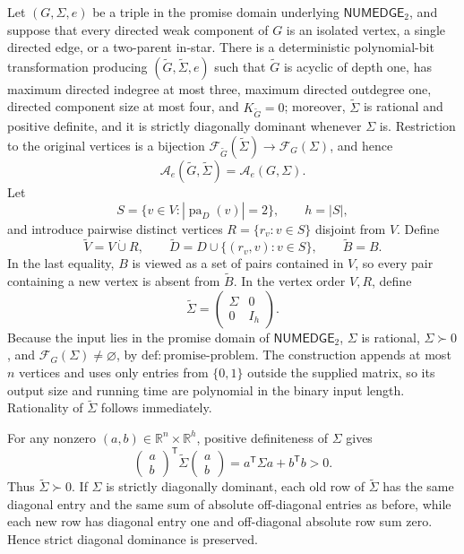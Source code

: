 Let \((G,\Sigma,e)\) be a triple in the promise domain underlying \(\mathsf{NUMEDGE}_2\), and suppose that every directed weak component of \(G\) is an isolated vertex, a single directed edge, or a two-parent in-star. There is a deterministic polynomial-bit transformation producing \((\widetilde G,\widetilde\Sigma,e)\) such that \(\widetilde G\) is acyclic of depth one, has maximum directed indegree at most three, maximum directed outdegree one, directed component size at most four, and \(K_{\widetilde G}=0\); moreover, \(\widetilde\Sigma\) is rational and positive definite, and it is strictly diagonally dominant whenever \(\Sigma\) is. Restriction to the original vertices is a bijection \(\mathcal F_{\widetilde G}(\widetilde\Sigma)\to\mathcal F_G(\Sigma)\), and hence
\[
\mathcal A_e(\widetilde G,\widetilde\Sigma)=\mathcal A_e(G,\Sigma).
\]
Let
\[
S=\{v\in V:|\operatorname{pa}_D(v)|=2\},
\qquad h=|S|,
\]
and introduce pairwise distinct vertices \(R=\{r_v:v\in S\}\) disjoint from \(V\). Define
\[
\widetilde V=V\mathbin{\dot\cup}R,
\qquad
\widetilde D=D\cup\{(r_v,v):v\in S\},
\qquad
\widetilde B=B.
\]
In the last equality, \(B\) is viewed as a set of pairs contained in \(V\), so every pair containing a new vertex is absent from \(\widetilde B\). In the vertex order \(V,R\), define
\[
\widetilde\Sigma=
\begin{pmatrix}
\Sigma&0\\
0&I_h
\end{pmatrix}.
\]
Because the input lies in the promise domain of \(\mathsf{NUMEDGE}_2\), \(\Sigma\) is rational, \(\Sigma\succ0\), and \(\mathcal F_G(\Sigma)\ne\varnothing\), by \(\mathrm{def:promise\mbox{-}problem}\). The construction appends at most \(n\) vertices and uses only entries from \(\{0,1\}\) outside the supplied matrix, so its output size and running time are polynomial in the binary input length. Rationality of \(\widetilde\Sigma\) follows immediately.

For any nonzero \((a,b)\in\mathbb R^n\times\mathbb R^h\), positive definiteness of \(\Sigma\) gives
\[
\begin{pmatrix}a\\b\end{pmatrix}^{\!\mathsf T}
\widetilde\Sigma
\begin{pmatrix}a\\b\end{pmatrix}
=a^{\mathsf T}\Sigma a+b^{\mathsf T}b>0.
\]
Thus \(\widetilde\Sigma\succ0\). If \(\Sigma\) is strictly diagonally dominant, each old row of \(\widetilde\Sigma\) has the same diagonal entry and the same sum of absolute off-diagonal entries as before, while each new row has diagonal entry one and off-diagonal absolute row sum zero. Hence strict diagonal dominance is preserved.

